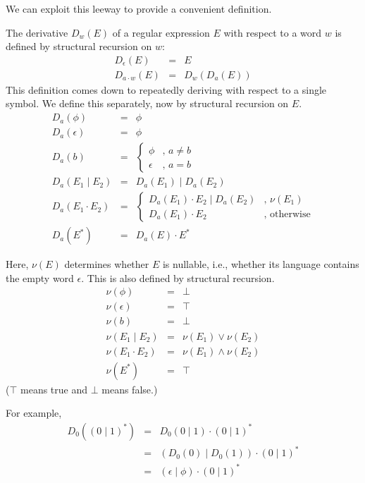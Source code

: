 We can exploit this leeway to provide a convenient definition.
\begin{definition}\label{def:derivative}
The derivative $D_w(E)$ of a regular expression $E$ with respect to a word $w$ is
defined by structural recursion on $w$: 
\begin{eqnarray*}
D_\epsilon(E)     & = & E \\
D_{a \cdot w}(E)  & = & D_w(D_a(E))
\end{eqnarray*}
This definition comes down to repeatedly deriving with respect to a single
symbol. We define this separately, now by structural recursion on $E$.
\begin{eqnarray*}
D_a(\phi)           & = & \phi \\
D_a(\epsilon)       & = & \phi \\
D_a(b)              & = & \left\{ \begin{array}{ll} \phi & \text{, }a \neq b \\ \epsilon & \text{, }a = b \end{array}\right. \\
D_a(E_1 \mid E_2)   & = & D_a(E_1) \mid D_a(E_2) \\
D_a(E_1 \cdot E_2)  & = & \left\{ \begin{array}{ll} D_a(E_1) \cdot E_2 \mid D_a(E_2) & \text{, }\nu(E_1)  \\ D_a(E_1) \cdot E_2 & \text{, otherwise} \end{array}\right. \\
D_a(E^*)            & = & D_a(E) \cdot E^*
\end{eqnarray*}

Here, $\nu(E)$ determines whether $E$ is nullable, i.e., whether its language
contains the empty word $\epsilon$. This is also defined by structural recursion.
\begin{eqnarray*}
\nu(\phi)           & = & \bot \\
\nu(\epsilon)       & = & \top \\
\nu(b)              & = & \bot \\
\nu(E_1 \mid E_2)   & = & \nu(E_1) \vee \nu(E_2)  \\
\nu(E_1 \cdot E_2)  & = & \nu(E_1) \wedge \nu(E_2) \\
\nu(E^*)            & = & \top
\end{eqnarray*}
($\top$ means true and $\bot$ means false.)
\end{definition}

For example, 
\begin{eqnarray*}
D_0( (0 \mid 1)^*) & = & D_0( 0 \mid 1) \cdot (0 \mid 1)^* \\
                   & = & (D_0(0) \mid D_0(1)) \cdot (0 \mid 1)^* \\
                   & = & (\epsilon \mid \phi) \cdot (0 \mid 1)^*
\end{eqnarray*}

